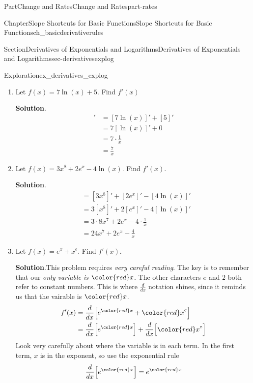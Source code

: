 \documentclass{tufte-book}
\newcommand{\blocktitlefont}{\relax}
\numberwithin{equation}{chapter}
\newcommand{\red}[1]{   {\color{red}   #1}   }
\newcommand{\ddx}[1]{ \dfrac{d}{dx} \Big[ #1 \Big]  }
\newcommand{\amp}{&}
\begin{document}
\begin{partptx}{Part}{Change and Rates}{}{Change and Rates}{}{}{part-rates}
\begin{chapterptx}{Chapter}{Slope Shortcuts for Basic Functions}{}{Slope Shortcuts for Basic Functions}{}{}{ch_basicderivativerules}
\begin{sectionptx}{Section}{Derivatives of Exponentials and Logarithms}{}{Derivatives of Exponentials and Logarithms}{}{}{sec-derivativesexplog}
\begin{exploration}{Exploration}{}{ex_derivatives_explog}
\begin{enumerate}[font=\bfseries,label=(\alph*),ref=\alph*]
\noindent\textbf{\blocktitlefont Solution}.\hypertarget{ex_derivatives_explog-1-2}{}\quad{}%
\begin{align*}
[12e^x - 2]'  \amp = [12e^x]' - [2]'\\
\amp = 12 [e^x]' - 0\\
\amp 12 e^x
\end{align*}
%
\item{}Let \(f(x) = 7\ln(x) + 5\).  Find \(f'(x)\)%
\par\smallskip%
\noindent\textbf{\blocktitlefont Solution}.\hypertarget{ex_derivatives_explog-2-2}{}\quad{}%
\begin{align*}
[7\ln(x) +5]'\amp = [7\ln(x)]' + [5]' \\
\amp =  7[\ln(x)]' + 0 \\
\amp = 7\cdot \frac{1}{x} \\
\amp = \frac{7}{x}
\end{align*}
%
\item{}Let \(f(x) = 3x^8 + 2e^x - 4\ln(x)\).  Find \(f'(x)\).%
\par\smallskip%
\noindent\textbf{\blocktitlefont Solution}.\hypertarget{ex_derivatives_explog-3-2}{}\quad{}%
\begin{align*}
[3x^8 + 2e^x - 4\ln(x)] \amp = [3x^8]' + [2e^x]' - [4\ln(x)]' \\
\amp  = 3[x^8]' + 2[e^x]' - 4[\ln(x)]'\\
\amp = 3\cdot 8x^7 + 2e^x - 4\cdot \frac{1}{x}\\
\amp = 24 x^7 + 2e^x - \frac{4}{x}
\end{align*}
%
\item{}Let \(f(x) = e^x + x^e \).  Find \(f'(x)\).%
\par\smallskip%
\noindent\textbf{\blocktitlefont Solution}.\hypertarget{ex_derivatives_explog-4-2}{}\quad{}This problem requires \emph{very careful reading}. The key is to remember that our \emph{only variable is \(\red x\)}.  The other characters \(e\) and \(2\) both refer to constant numbers. This is where \(\frac{d}{dx}\) notation shines, since it reminds us that the vairable is \(\red x\).%
\begin{align*}
f'(x) \amp = \ddx{ e^{\red x} + {\red x}^e} \\
\amp = \ddx{e^{\red x}} + \ddx{{\red x}^e}  
\end{align*}
Look very carefully about where the variable is in each term.  In the first term, \(x\) is in the exponent, so use the exponential rule%
\begin{equation*}
\ddx{e^{\red x}} = e^{\red x}

\end{equation*}
\end{enumerate}
\end{exploration}
\end{sectionptx}
\end{chapterptx}
\end{partptx}
\end{document}

